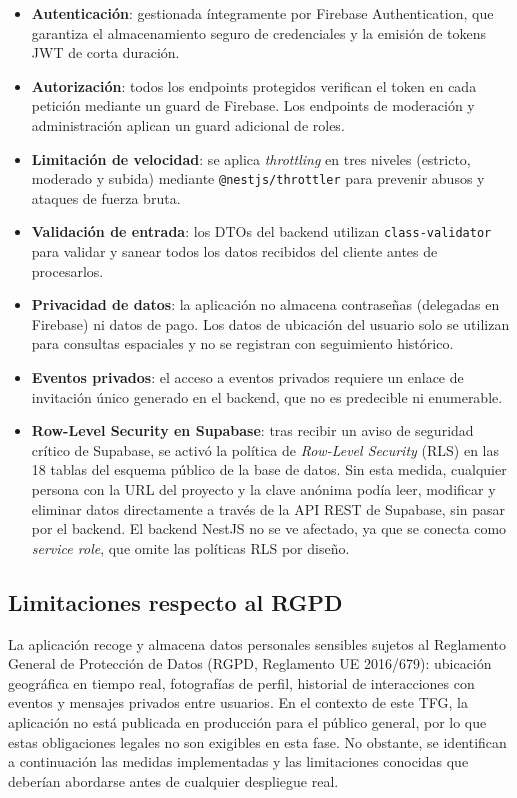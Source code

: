 \begin{itemize}
    \item \textbf{Autenticación}: gestionada íntegramente por Firebase Authentication, que garantiza el almacenamiento seguro de credenciales y la emisión de tokens JWT de corta duración.
    \item \textbf{Autorización}: todos los endpoints protegidos verifican el token en cada petición mediante un guard de Firebase. Los endpoints de moderación y administración aplican un guard adicional de roles.
    \item \textbf{Limitación de velocidad}: se aplica \textit{throttling} en tres niveles (estricto, moderado y subida) mediante \texttt{@nestjs/throttler} para prevenir abusos y ataques de fuerza bruta.
    \item \textbf{Validación de entrada}: los DTOs del backend utilizan \texttt{class-validator} para validar y sanear todos los datos recibidos del cliente antes de procesarlos.
    \item \textbf{Privacidad de datos}: la aplicación no almacena contraseñas (delegadas en Firebase) ni datos de pago. Los datos de ubicación del usuario solo se utilizan para consultas espaciales y no se registran con seguimiento histórico.
    \item \textbf{Eventos privados}: el acceso a eventos privados requiere un enlace de invitación único generado en el backend, que no es predecible ni enumerable.
    \item \textbf{Row-Level Security en Supabase}: tras recibir un aviso de seguridad crítico de Supabase, se activó la política de \textit{Row-Level Security} (RLS) en las 18 tablas del esquema público de la base de datos. Sin esta medida, cualquier persona con la URL del proyecto y la clave anónima podía leer, modificar y eliminar datos directamente a través de la API REST de Supabase, sin pasar por el backend. El backend NestJS no se ve afectado, ya que se conecta como \textit{service role}, que omite las políticas RLS por diseño.
\end{itemize}

\subsection{Limitaciones respecto al RGPD}

La aplicación recoge y almacena datos personales sensibles sujetos al Reglamento General de Protección de Datos (RGPD, Reglamento UE 2016/679): ubicación geográfica en tiempo real, fotografías de perfil, historial de interacciones con eventos y mensajes privados entre usuarios. En el contexto de este TFG, la aplicación no está publicada en producción para el público general, por lo que estas obligaciones legales no son exigibles en esta fase. No obstante, se identifican a continuación las medidas implementadas y las limitaciones conocidas que deberían abordarse antes de cualquier despliegue real.

